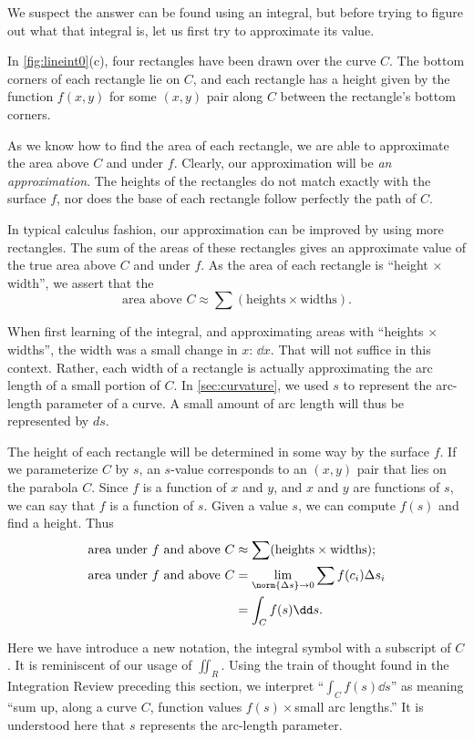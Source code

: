 We suspect the answer can be found using an integral, but before trying to figure out what that integral is, let us first try to approximate its value. 

In \autoref{fig:lineint0}(c), four rectangles have been drawn over the curve $C$. The bottom corners of each rectangle lie on $C$, and each rectangle has a height given by the function $f(x,y)$ for some $(x,y)$ pair along $C$ between the rectangle's bottom corners. 

As we know how to find the area of each rectangle, we are able to approximate the area above $C$ and under $f$. Clearly, our approximation will be \emph{an approximation}. The heights of the rectangles do not match exactly with the surface $f$, nor does the base of each rectangle follow perfectly the path of $C$.

In typical calculus fashion, our approximation can be improved by using more rectangles. The sum of the areas of these rectangles gives an approximate value of the true area above $C$ and under $f$. As the area of each rectangle is ``height $\times$ width'', we assert that the
\[\text{area above $C$}\approx \sum (\text{heights}\times\text{widths}).\]

When first learning of the integral, and approximating areas with ``heights $\times$ widths'', the width was a small change in $x$: $\dd x$. That will not suffice in this context. Rather, each width of a rectangle is actually approximating the arc length of a small portion of $C$. In \autoref{sec:curvature}, we used $s$ to represent the arc-length parameter of a curve. A small amount of arc length will thus be represented by $ds$. 

The height of each rectangle will be determined in some way by the surface $f$. If we parameterize $C$ by $s$, an $s$-value corresponds to an $(x,y)$ pair that lies on the parabola $C$. Since $f$ is a function of $x$ and $y$, and $x$ and $y$ are functions of $s$, we can say that $f$ is a function of $s$. Given a value $s$, we can compute $f(s)$ and find a height. Thus
\begin{align}
	\text{area under $f$ and above $C$}
	&\approx \sum (\text{heights}\times\text{widths});\notag\\
	\text{area under $f$ and above $C$}
	&=\lim_{\norm{\Delta s}\to0}\sum f(c_i)\Delta s_i\notag\\
	&=\int_Cf(s)\dd s.\label{eq:line0}
\end{align}

Here we have introduce a new notation, the integral symbol with a subscript of $C$. It is reminiscent of our usage of $\iint_R$. Using the train of thought found in the Integration Review preceding this section, we interpret ``$\int_C f(s)\dd s$'' as meaning ``sum up, along a curve $C$, function values $f(s)\times$small arc lengths.'' It is understood here that $s$ represents the arc-length parameter.

